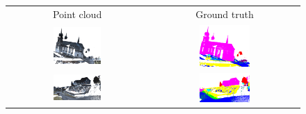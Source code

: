 \begin{figure}
    \centering
    \begin{tabular}{cc}
        Point cloud & Ground truth \\
        \includegraphics[width=0.35\textwidth, height=0.15\textheight]{images/sem3d_data/1.pdf} &
        \includegraphics[width=0.35\textwidth, height=0.15\textheight]{images/sem3d_data/1_gt.pdf}\\
        
        \includegraphics[width=0.35\textwidth, height=0.15\textheight]{images/sem3d_data/2.pdf} & 
        \includegraphics[width=0.35\textwidth, height=0.15\textheight]{images/sem3d_data/2_gt.pdf}\\
        

\end{tabular}
\end{figure}
